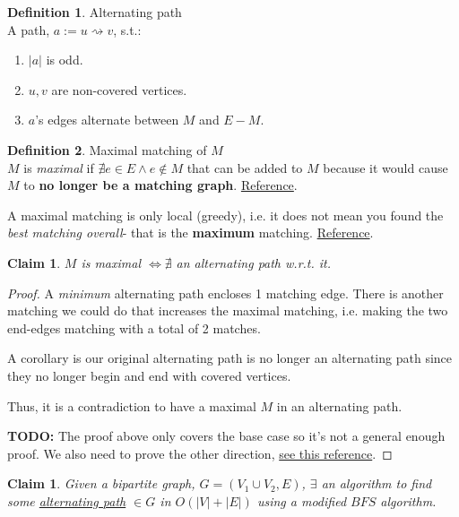 \documentclass{article}
\newtheorem{claim}[theorem]{Claim}
\theoremstyle{definition}
\newtheorem{definition}{Definition}[section]
\begin{document}
\begin{definition}{Alternating path}
	\label{def:alt_path}
	\\A path, $a := u \rightsquigarrow v$, s.t.:
	\begin{enumerate}
		\item $|a|$ is odd.
		\item $u, v$ are non-covered vertices.
		\item $a$'s edges alternate between $M$ and $E-M$.
	\end{enumerate}
\end{definition}

\begin{definition} {Maximal matching of $M$}
	\label{def:maximal_m}
	\\$M$ is \textit{maximal} if $\nexists e \in E \land e \notin M$ that can be added to $M$ because it would cause $M$ to \textbf{no longer be a matching graph}. \href{https://brilliant.org/wiki/matching/}{Reference}.
	
	A maximal matching is only local (greedy), i.e. it does not mean you found the \textit{best matching overall}- that is the \textbf{maximum} matching. \href{https://piazza.com/class/k52uzg6xjkl5xz?cid=618_f4}{Reference}.
\end{definition}

\begin{claim}
	$M$ is maximal $\iff \nexists$ an alternating path w.r.t. it.
\end{claim}

\begin{proof}	
	A \textit{minimum} alternating path encloses 1 matching edge. There is another matching we could do that increases the maximal matching, i.e. making the two end-edges matching with a total of 2 matches.
	
	A corollary is our original alternating path is no longer an alternating path since they no longer begin and end with covered vertices.
	
	Thus, it is a contradiction to have a maximal $M$ in an alternating path.
	
	\textbf{TODO:} The proof above only covers the base case so it's not a general enough proof. We also need to prove the other direction, \href{http://www-cs-students.stanford.edu/~csilvers/proof/node4.html}{see this reference}.
\end{proof}

\begin{claim}
	Given a bipartite graph, $G = (V_1 \cup V_2, E)$, $\exists$ an algorithm to find some \hyperref[def:alt_path]{alternating path} $\in G$ in $O(|V|+|E|)$ using a modified $BFS$ algorithm.
\end{claim}
\end{document}

